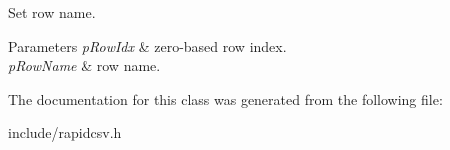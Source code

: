 Set row name. 


\begin{DoxyParams}{Parameters}
{\em p\+Row\+Idx} & zero-\/based row index. \\
\hline
{\em p\+Row\+Name} & row name. \\
\hline
\end{DoxyParams}


The documentation for this class was generated from the following file\+:\begin{DoxyCompactItemize}
\item 
include/rapidcsv.\+h\end{DoxyCompactItemize}
